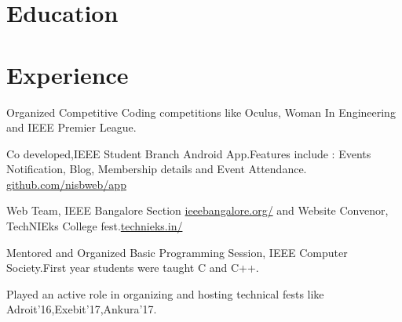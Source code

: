 \documentclass[]{deedy-resume-openfont}
\begin{document}
%
%

%
%






\section{Education}
\sectionsep

\section{Experience}

\begin{tightemize}
\item Organized Competitive Coding competitions like Oculus, Woman In Engineering
and IEEE Premier League.
\item Co developed,IEEE Student Branch Android App.Features include : Events
Notification, Blog, Membership details and Event Attendance.
\href{https://www.github.com/nisbweb/app}{github.com/nisbweb/app}
\item Web Team, IEEE Bangalore Section \href{https://www.ieeebangalore.org/}{ieeebangalore.org/} and Website Convenor, TechNIEks College fest.\href{https://www.technieks.in/}{technieks.in/}
\item Mentored and Organized Basic Programming Session, IEEE Computer Society.First year students were taught C and C++.
\item Played an active role in organizing and hosting technical fests like Adroit'16,Exebit'17,Ankura'17.
\end{tightemize}
\sectionsep
\end{document}

